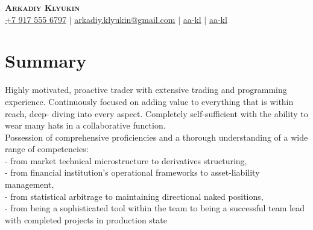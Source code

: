 \documentclass[a4paper,20pt]{article}
\begin{document}

\begin{center}
  \textbf{\Huge \scshape Arkadiy Klyukin} \\ \vspace{1pt}
  \small
  \faMobile \hspace{.5pt} \href{tel:+79175556797}{+7 917 555 6797}
  $|$
  \faAt \hspace{.5pt} \href{mailto:arkadiy.klyukin@gmail.com}{arkadiy.klyukin@gmail.com}
  $|$
  \faLinkedinSquare \hspace{.5pt} \href{https://www.linkedin.com/in/aa-kl}{aa-kl}
  $|$
  \faGithub \hspace{.5pt} \href{https://github.com/aa-kl}{aa-kl}
\end{center}


\vspace{-15pt}
\section{Summary}
Highly motivated, proactive trader with extensive trading and programming experience. Continuously focused on adding value to everything that is within reach, deep-
diving into every aspect. Completely self-sufficient with the ability to wear many hats in a collaborative function.\\
Possession of comprehensive proficiencies and a thorough understanding of a wide range of competencies:\\
- from market technical microstructure to derivatives structuring,\\
- from financial institution's operational frameworks to asset-liability management,\\
- from statistical arbitrage to maintaining directional naked positions,\\
- from being a sophisticated tool within the team to being a successful team lead with completed projects in production state\\

\vspace{-5pt}
\end{document}
